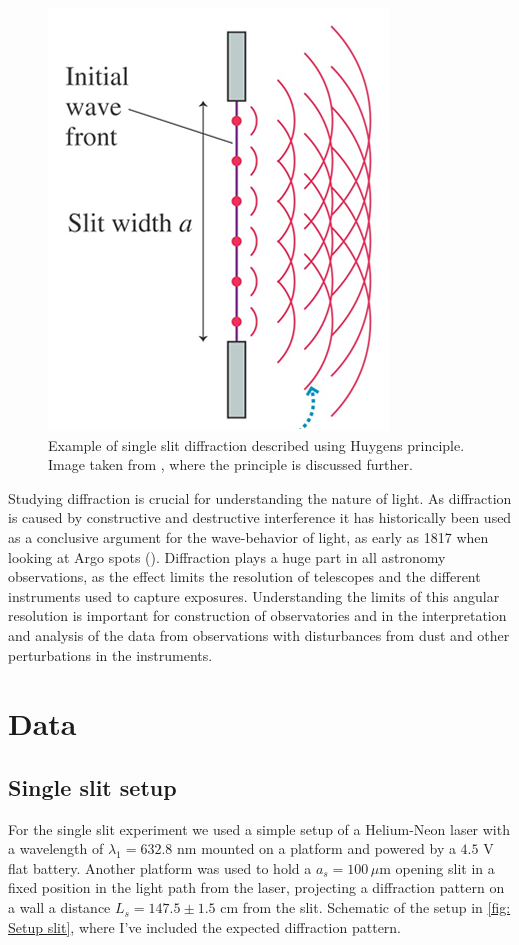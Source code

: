 \documentclass{emulateapj}
\begin{document}
\begin{figure}
	\centering
	\includegraphics[scale=0.4]{Huygens.png}
	\caption[Huygens principle visualization]{Example of single slit diffraction described using Huygens principle. Image taken from \citep{Huygens}, where the principle is discussed further.}
	\label{fig: Huygens principle}
\end{figure}

Studying diffraction is crucial for understanding the nature of light. As diffraction is caused by constructive and destructive interference it has historically been used as a conclusive argument for the wave-behavior of light, as early as 1817 when looking at Argo spots (\citep{wiki:Arago}). Diffraction plays a huge part in all astronomy observations, as the effect limits the resolution of telescopes and the different instruments used to capture exposures. Understanding the limits of this angular resolution is important for construction of observatories and in the interpretation and analysis of the data from observations with disturbances from dust and other perturbations in the instruments.

\section{Data}
\label{sec:data}
\subsection{Single slit setup}
\label{subsec: Data/single slit setup}
For the single slit experiment we used a simple setup of a Helium-Neon laser with a wavelength of $\lambda_1 = 632.8$ nm mounted on a platform and powered by a $4.5$ V flat battery. Another platform was used to hold a $a_s=100 \, \mu$m opening slit in a fixed position in the light path from the laser, projecting a diffraction pattern on a wall a distance $L_s = 147.5 \pm 1.5$ cm from the slit. Schematic of the setup in \cref{fig: Setup slit}, where I've included the expected diffraction pattern.
\end{document}
